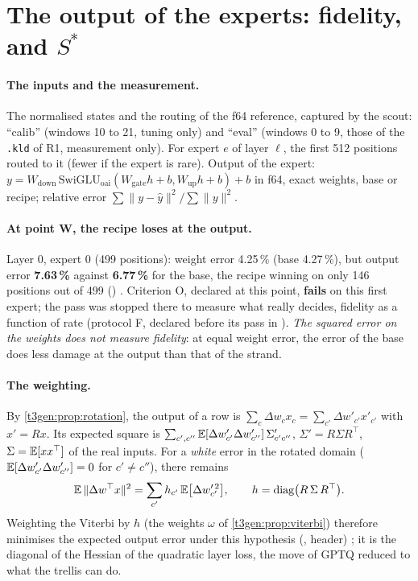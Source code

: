 \section{The output of the experts: fidelity, and \texorpdfstring{$S^{*}$}{S*}}\label{t3gen:sec:sortie}

\paragraph{The inputs and the measurement.} The normalised states and the routing of the f64 reference, captured by the scout: ``calib'' (windows 10 to 21, tuning only) and ``eval'' (windows 0 to 9, those of the \texttt{.kld} of R1, measurement only). For expert $e$ of layer $\ell$, the first 512 positions routed to it (fewer if the expert is rare). Output of the expert: $y = W_{\text{down}}\,\mathrm{SwiGLU}_{\text{oai}}(W_{\text{gate}} h + b, W_{\text{up}} h + b) + b$ in f64, exact weights, base or recipe; relative error $\sum\|y - \hat y\|^2 / \sum\|y\|^2$.

\paragraph{At point W, the recipe loses at the output.} Layer 0, expert 0 (499 positions): weight error 4.25\,\% (base 4.27\,\%), but output error \textbf{7.63\,\%} against \textbf{6.77\,\%} for the base, the recipe winning on only 146 positions out of 499 () \mes. Criterion O, declared at this point, \textbf{fails} on this first expert; the pass was stopped there to measure what really decides, fidelity as a function of rate (protocol F, declared before its pass in ). \emph{The squared error on the weights does not measure fidelity}: at equal weight error, the error of the base does less damage at the output than that of the strand.

\paragraph{The weighting.} By \cref{t3gen:prop:rotation}, the output of a row is $\sum_c \Delta w_c x_c = \sum_{c'} \Delta w'_{c'} x'_{c'}$ with $x' = Rx$. Its expected square is $\sum_{c', c''} \mathbb{E}[\Delta w'_{c'} \Delta w'_{c''}]\, \Sigma'_{c'c''}$, $\Sigma' = R\Sigma R^\top$, $\Sigma = \mathbb{E}[xx^\top]$ of the real inputs. For a \emph{white} error in the rotated domain ($\mathbb{E}[\Delta w'_{c'}\Delta w'_{c''}] = 0$ for $c' \ne c''$), there remains
\begin{equation}\label{t3gen:eq:ponderation}
\mathbb{E}\,\|\Delta w^\top x\|^2 = \sum_{c'} h_{c'}\, \mathbb{E}\bigl[\Delta w'^{\,2}_{c'}\bigr], \qquad h = \mathrm{diag}\bigl(R\,\Sigma\,R^\top\bigr) .
\end{equation}
Weighting the Viterbi by $h$ (the weights $\omega$ of \cref{t3gen:prop:viterbi}) therefore minimises the expected output error under this hypothesis (, header) \calc; it is the diagonal of the Hessian of the quadratic layer loss, the move of GPTQ reduced to what the trellis can do.

